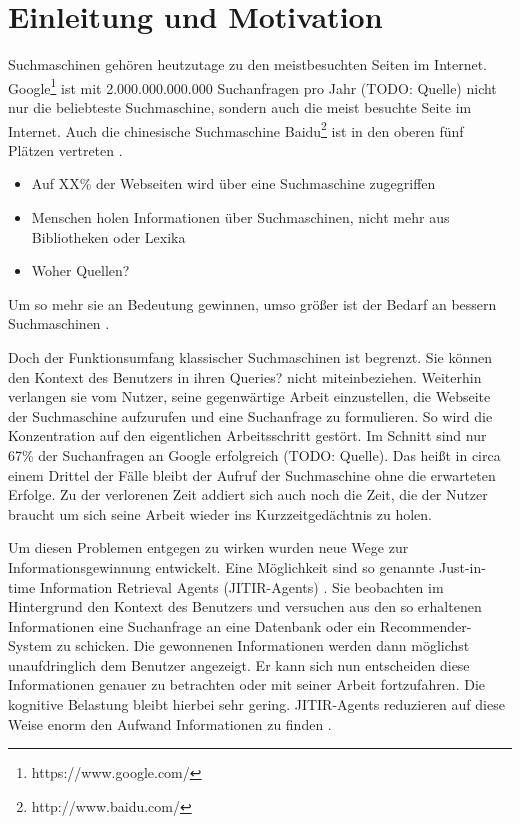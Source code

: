 \section{Einleitung und Motivation}
Suchmaschinen gehören heutzutage zu den meistbesuchten Seiten im Internet. Google\footnote{https://www.google.com/} ist mit 2.000.000.000.000 Suchanfragen pro Jahr (TODO: Quelle) nicht nur die beliebteste Suchmaschine, sondern auch die meist besuchte Seite im Internet. Auch die chinesische Suchmaschine Baidu\footnote{http://www.baidu.com/} ist in den oberen fünf Plätzen vertreten \cite{alexa}. 
\begin{itemize}
	\item Auf XX\% der Webseiten wird über eine Suchmaschine zugegriffen
	\item Menschen holen Informationen über Suchmaschinen, nicht mehr aus Bibliotheken oder Lexika 
	\item Woher Quellen?
\end{itemize}
Um so mehr sie an Bedeutung gewinnen, umso größer ist der Bedarf an bessern Suchmaschinen \cite{lawrence2000context}.

Doch der Funktionsumfang klassischer Suchmaschinen ist begrenzt. Sie können den Kontext des Benutzers in ihren Queries? nicht miteinbeziehen. Weiterhin verlangen sie vom Nutzer, seine gegenwärtige Arbeit einzustellen, die Webseite der Suchmaschine aufzurufen und eine Suchanfrage zu formulieren. So wird die Konzentration auf den eigentlichen Arbeitsschritt gestört. Im Schnitt sind nur 67\% der Suchanfragen an Google erfolgreich (TODO: Quelle). Das heißt in circa einem Drittel der Fälle bleibt der Aufruf der Suchmaschine ohne die erwarteten Erfolge. Zu der verlorenen Zeit addiert sich auch noch die Zeit, die der Nutzer braucht um sich seine Arbeit wieder ins Kurzzeitgedächtnis zu holen.

Um diesen Problemen entgegen zu wirken wurden neue Wege zur Informationsgewinnung entwickelt. Eine Möglichkeit sind so genannte Just-in-time Information Retrieval Agents (JITIR-Agents) \cite{rhodes2000just}. Sie beobachten im Hintergrund den Kontext des Benutzers und versuchen aus den so erhaltenen Informationen eine Suchanfrage an eine Datenbank oder ein Recommender-System zu schicken. Die gewonnenen Informationen werden dann möglichst unaufdringlich dem Benutzer angezeigt. Er kann sich nun entscheiden diese Informationen genauer zu betrachten oder mit seiner Arbeit fortzufahren. Die kognitive Belastung bleibt hierbei sehr gering. JITIR-Agents reduzieren auf diese Weise enorm den Aufwand Informationen zu finden \cite{rhodes2000just}.

